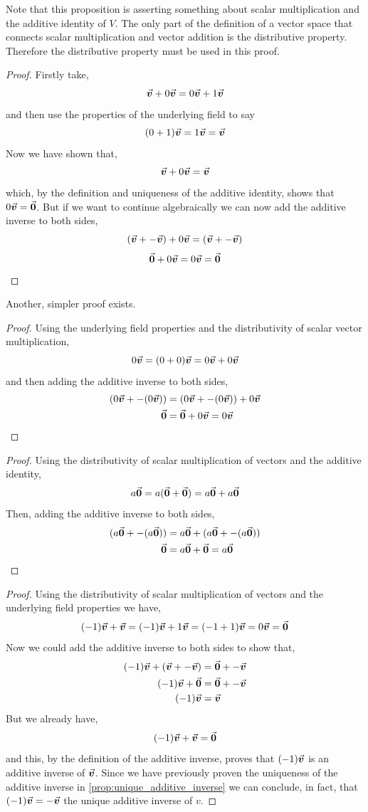 \documentclass[MathsNotesBase.tex]{subfiles}
\begin{document}
{		\bigskip
		Note that this proposition is asserting something about scalar multiplication and the additive identity of $V$. The only part of the definition of a vector space that connects scalar multiplication and vector addition is the distributive property. Therefore the distributive property must be used in this proof.
		\begin{proof}
			Firstly take,
			\[ \vec{\bm{v}} + 0\vec{\bm{v}} = 0\vec{\bm{v}} + 1\vec{\bm{v}} \]
			and then use the properties of the underlying field to say
			\[ (0 + 1)\vec{\bm{v}} = 1\vec{\bm{v}} = \vec{\bm{v}} \]
			Now we have shown that,
			\[ \vec{\bm{v}} + 0\vec{\bm{v}} = \vec{\bm{v}} \]
			which, by the definition and uniqueness of the additive identity, shows that $0\vec{\bm{v}} = \vec{\bm{0}}$. But if we want to continue algebraically we can now add the additive inverse to both sides,
			\[ (\vec{\bm{v}} + -\vec{\bm{v}}) + 0\vec{\bm{v}} = (\vec{\bm{v}} + -\vec{\bm{v}}) \]
			\[ \vec{\bm{0}} + 0\vec{\bm{v}} = 0\vec{\bm{v}} = \vec{\bm{0}} \qedhere\]
		\end{proof}
		Another, simpler proof exists. 
		\begin{proof}
			Using the underlying field properties and the distributivity of scalar vector multiplication,
			\[ 0\vec{\bm{v}} = (0 + 0)\vec{\bm{v}} = 0\vec{\bm{v}} + 0\vec{\bm{v}} \]
			and then adding the additive inverse to both sides,
			\begin{align*}
			(0\vec{\bm{v}} + -(0\vec{\bm{v}})) &= (0\vec{\bm{v}} + -(0\vec{\bm{v}})) + 0\vec{\bm{v}} \\
			\vec{\bm{0}} &= \vec{\bm{0}} + 0\vec{\bm{v}} = 0\vec{\bm{v}} \qedhere
			\end{align*}
		\end{proof}
		
		\bigskip
		\begin{proof}
			Using the distributivity of scalar multiplication of vectors and the additive identity,
			\[ a\vec{\bm{0}} = a(\vec{\bm{0}} + \vec{\bm{0}}) = a\vec{\bm{0}} + a\vec{\bm{0}} \]
			Then, adding the additive inverse to both sides,
			\begin{align*}
			(a\vec{\bm{0}} + -(a\vec{\bm{0}})) &= a\vec{\bm{0}} + (a\vec{\bm{0}} + -(a\vec{\bm{0}}))\\
			\vec{\bm{0}} &= a\vec{\bm{0}} + \vec{\bm{0}} = a\vec{\bm{0}} \qedhere
			\end{align*}
		\end{proof}
		
		\bigskip
		\begin{proof}
			Using the distributivity of scalar multiplication of vectors and the underlying field properties we have,
			\[ (-1)\vec{\bm{v}} + \vec{\bm{v}} = (-1)\vec{\bm{v}} + 1\vec{\bm{v}} = (-1 + 1)\vec{\bm{v}} = 0\vec{\bm{v}} = \vec{\bm{0}} \]
			Now we could add the additive inverse to both sides to show that,
			\begin{align*} 
			(-1)\vec{\bm{v}} + (\vec{\bm{v}} + -\vec{\bm{v}}) &= \vec{\bm{0}} + -\vec{\bm{v}} \\
			(-1)\vec{\bm{v}} + \vec{\bm{0}} &= \vec{\bm{0}} + -\vec{\bm{v}} \\
			(-1)\vec{\bm{v}} &= \vec{\bm{v}} \qedhere
			\end{align*}
			But we already have,
			\[ (-1)\vec{\bm{v}} + \vec{\bm{v}} =\vec{\bm{0}} \]
			and this, by the definition of the additive inverse, proves that $(-1)\vec{\bm{v}}$ is an additive inverse of $\vec{\bm{v}}$. Since we have previously proven the uniqueness of the additive inverse in \autoref{prop:unique_additive_inverse} we can conclude, in fact, that $(-1)\vec{\bm{v}} = -\vec{\bm{v}}$ the unique additive inverse of $v$.
		\end{proof}
	
}
\end{document}

